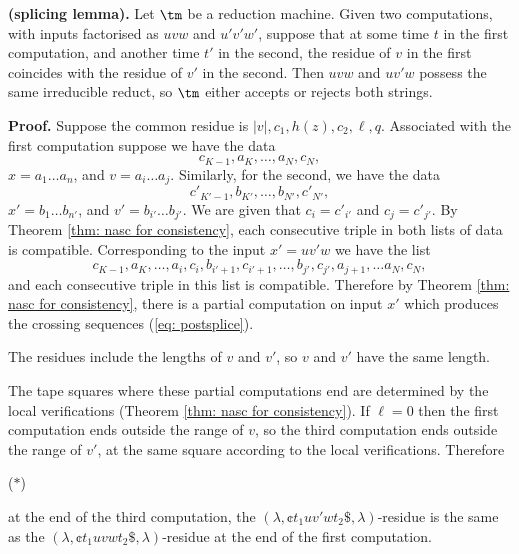 \begin{lemma}
\label{lem: splicing}
{\bf (splicing lemma).}
Let $\tm$ be a reduction machine.
Given two computations, with inputs factorised as
$uvw$ and $u'v'w'$,
suppose that at some time $t$ in the first
computation, and another time $t'$ in the second,
the residue of $v$ in the first
coincides with the residue of $v'$ in the second.
Then $uvw$ and $uv'w$ possess the same irreducible
reduct, so $\tm$ either accepts or rejects both
strings.
\end{lemma}

{\bf Proof.}
Suppose the common residue is
$ |v|, c_1, h(z), c_2, \ell, q $.
Associated with the first computation suppose we have the
data
\begin{equation}
\label{eq: presplice 1}
 c_{K-1}, a_K, \ldots, a_N, c_N,
\end{equation} $x = a_1\ldots a_n$,
and $v = a_i \ldots a_j$.  Similarly, for the second, we have the data
\begin{equation}
\label{eq: presplice 2}
c'_{K'-1}, b_{K'}, \ldots, b_{N'}, c'_{N'},
\end{equation}
$x' = b_1\ldots b_{n'}$,
and $v' = b_{i'} \ldots b_{j'}$.  We are given
that $c_i = c'_{i'}$ and $c_j = c'_{j'}$.
By
Theorem \ref{thm: nasc for consistency}, each consecutive
triple in both lists of data is compatible.  Corresponding
to the input $x' = uv'w$ we have the list
\begin{equation}
\label{eq: postsplice}
c_{K-1}, a_K, \ldots, a_i, c_i,
b_{i'+1}, c_{i'+1}, \ldots, b_{j'}, c_{j'},
a_{j+1}, \ldots a_N, c_N,
\end{equation} and each consecutive triple
in this list is compatible.  Therefore
by Theorem \ref{thm: nasc for consistency},
there is a partial
computation on input $x'$ which produces the crossing
sequences (\ref{eq: postsplice}).

The residues include the lengths of $v$ and $v'$, so
$v$ and $v'$ have the same length.

The tape squares where these partial computations end
are determined by the local verifications (Theorem
\ref{thm: nasc for consistency}).  If $\ell=0$ then
the first computation ends outside the range of $v$,
so the third computation ends outside the range of $v'$,
at the same square according to the local verifications.
Therefore

\vspace*{6pt}
($*$)\hspace*{1cm}
\begin{minipage}{5in}
at the end of the third computation, the
$(\lambda,\cent t_1 uv'wt_2\$, \lambda)$-residue
is the same as the $(\lambda, \cent t_1 uvwt_2\$, \lambda)$-residue at the end of the
first computation.
\end{minipage}
\hfil
\vspace*{6pt}

